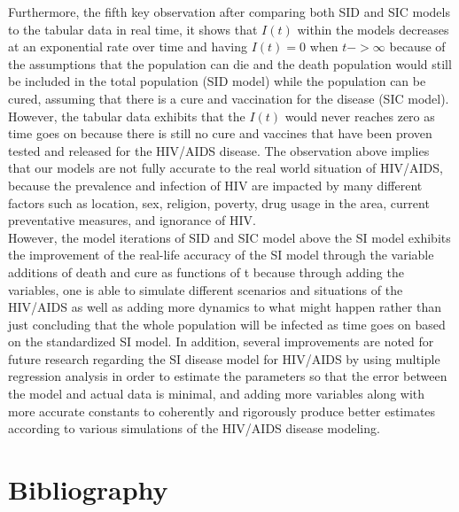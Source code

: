 \documentclass[a4paper, final, 12pt]{article}
\numberwithin{equation}{section}
\begin{document}
Furthermore, the fifth key observation after comparing both SID and SIC models to the tabular data in real time, it shows that $I(t)$ within the models decreases at an exponential rate over time and having $I(t) = 0$ when $t -> \infty$ because of the assumptions that the population can die and the death population would still be included in the total population (SID model) while the population can be cured, assuming that there is a cure and vaccination for the disease (SIC model). However, the tabular data exhibits that the $I(t)$ would never reaches zero as time goes on because there is still no cure and vaccines that have been proven tested and released for the HIV/AIDS disease. The observation above implies that our models are not fully accurate to the real world situation of HIV/AIDS, because the prevalence and infection of HIV are impacted by many different factors such as location, sex, religion, poverty, drug usage in the area, current preventative measures, and ignorance of HIV. \\

However, the model iterations of SID and SIC model above the SI model exhibits the improvement of the real-life accuracy of the SI model through the variable additions of death and cure as functions of t because through adding the variables, one is able to simulate different scenarios and situations of the HIV/AIDS as well as adding more dynamics to what might happen rather than just concluding that the whole population will be infected as time goes on based on the standardized SI model. In addition, several improvements are noted for future research regarding the SI disease model for HIV/AIDS by using multiple regression analysis in order to estimate the parameters so that the error between the model and actual data is minimal, and adding more variables along with more accurate constants to coherently and rigorously produce better estimates according to various simulations of the HIV/AIDS disease modeling. \\




\pagebreak
\section{Bibliography}
\end{document}
